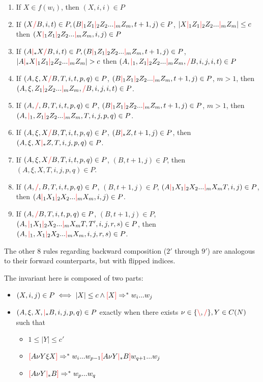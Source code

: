 \documentclass[12pt]{extarticle}
\theoremstyle{definition} \newtheorem{defn}{Definition}
\theoremstyle{definition} \newtheorem{prop}{Proposition}
\newcommand{\lc}{\textcolor{red}{\backslash}}
\newcommand{\rc}{\textcolor{red}{/}}
\newcommand{\mc}{\textcolor{red}{|}}
\newcommand{\lb}{\textcolor{red}{[}}
\newcommand{\rb}{\textcolor{red}{]}}
\begin{document}
\begin{enumerate}
    \item If $X \in f(w_i)$, then $(X, i, i) \in P$
    \item If $(X \rc B, i, t) \in P, (B \mc_1 Z_1 \mc_2 Z_2 ... \mc_m Z_m, t + 1, j) \in P$,
        $|X \mc_1 Z_1 \mc_2 Z_2 ... \mc_m Z_m| \leq c$
        then $(X \mc_1 Z_1 \mc_2 Z_2 ... \mc_m Z_m, i, j) \in P$
    \item If $(A \mc_* X \rc B, i, t) \in P, (B \mc_1 Z_1 \mc_2 Z_2 ... \mc_m Z_m, t + 1, j) \in P$,
        $|A \mc_* X \mc_1 Z_1 \mc_2 Z_2 ... \mc_m Z_m| > c$
        then $(A, \mc_1, Z_1 \mc_2 Z_2 ... \mc_m Z_m, \rc B, i, j, i, t) \in P$
    \item If $(A, \xi, X \rc B, T, i, t, p, q) \in P$,
        $(B \mc_1 Z_1 \mc_2 Z_2 ... \mc_m Z_m, t + 1, j) \in P$,
        $m > 1$, then $(A, \xi, Z_1 \mc_2 Z_2 ... \mc_m Z_m, \rc B, i, j, i, t) \in P$.
    \item If $(A, \rc, B, T, i, t, p, q) \in P$,
        $(B \mc_1 Z_1 \mc_2 Z_2 ... \mc_m Z_m, t + 1, j) \in P$,
        $m > 1$, then $(A, \mc_1, Z_1 \mc_2 Z_2 ... \mc_m Z_m, T, i, j, p, q) \in P$.
    \item If $(A, \xi, X \rc B, T, i, t, p, q) \in P$,
        $(B \mc_* Z, t + 1, j) \in P$,
        then $(A, \xi, X \mc_* Z, T, i, j, p, q) \in P$.
    \item If $(A, \xi, X \rc B, T, i, t, p, q) \in P$,
        $(B, t + 1, j) \in P$,
        then $(A, \xi, X, T, i, j, p, q) \in P$.
    \item If $(A, \rc, B, T, i, t, p, q) \in P$,
        $(B, t + 1, j) \in P$, $(A \mc_1 X_1 \mc_2 X_2 ... \mc_m X_m T, i, j) \in P$,
        then $(A \mc_1 X_1 \mc_2 X_2 ... \mc_m X_m, i, j) \in P$.
    \item If $(A, \rc B, T, i, t, p, q) \in P$,
        $(B, t + 1, j) \in P$, $(A, \mc_1 X_1 \mc_2 X_2 ... \mc_m X_m T, T', i, j, r, s) \in P$,
        then $(A, \mc_1, X_1 \mc_2 X_2 ... \mc_m X_m, i, j, r, s) \in P$.
\end{enumerate}

The other 8 rules regarding backward composition
($2'$ through $9'$) are analogous to their forward counterparts, but with
flipped indices.

The invariant here is composed of two parts:

\begin{itemize}
    \item $(X, i, j) \in P \iff |X| \leq c \land \lb X \rb \Rightarrow^* w_i ... w_j$
    \item $(A, \xi, X, \mc_* B, i, j, p, q) \in P$
        exactly when there exists $\nu \in \{ \lc, \rc \}, Y \in C(N)$ such that
        \begin{itemize}
            \item $1 \leq |Y| \leq c'$
            \item $\lb A \nu Y \xi X \rb \Rightarrow^* w_i ... w_{p - 1} \lb A \nu Y \mc_* B \rb w_{q + 1} ... w_j$
            \item $\lb A \nu Y \mc_* B \rb \Rightarrow^* w_p ... w_q$
        \end{itemize}
\end{itemize}
\end{document}

